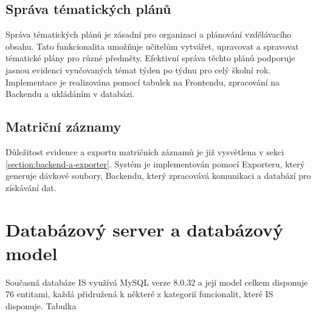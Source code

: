 \documentclass[FM,Proj]{tulthesis}
\begin{document}
\subsection*{Správa tématických plánů}
Správa tématických plánů  je zásadní pro organizaci a plánování vzdělávacího obsahu.
Tato funkcionalita umožňuje učitelům vytvářet, upravovat a spravovat tématické plány
pro různé předměty. Efektivní správa těchto plánů podporuje jasnou evidenci vyučovaných
témat týden po týdnu pro celý školní rok. Implementace je realizována pomocí tabulek
na Frontendu, zpracování na Backendu a ukládáním v databázi.

\subsection*{Matriční záznamy}
Důležitost evidence a exportu matričních záznamů je již vysvětlena v sekci 
\ref{section:backend-a-exporter}. Systém je implementován pomocí Exporteru, 
který generuje dávkové soubory, Backendu, který zpracovává komunikaci a databází
pro získávání dat.


\section{Databázový server a databázový model}
Současná databáze IS využívá MySQL verze 8.0.32 a její model celkem disponuje 76 entitami,
každá přidružená k některé z kategorií funcionalit, které IS disponuje.
Tabulka 
\end{document}
